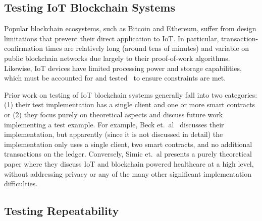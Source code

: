 
\subsection{Testing IoT Blockchain Systems}


Popular blockchain ecosystems, such as Bitcoin and Ethereum, suffer from design limitations that prevent their direct application to IoT. In particular, transaction-confirmation times are relatively long (around tens of minutes) and variable on public blockchain networks due largely to their proof-of-work algorithms. Likewise, IoT devices have limited processing power and storage capabilities, which must be accounted for and tested~\cite{IoTandBl20:online} to ensure constraints are met.

Prior work on testing of IoT blockchain systems generally fall into two categories: (1) their test implementation has a single client and one or more smart contracts or (2) they focus purely on theoretical aspects and discuss future work implementing a test example. For example, Beck et.\ al~\cite{beck2016blockchain} discusses their implementation, but apparently (since it is not discussed in detail) the implementation only uses a single client, two smart contracts, and no additional transactions on the ledger. Conversely, Simic et.\ al \cite{simicCaseStudyIoTBlockchainHealthcare2017}  presents a purely theoretical paper where they discuss IoT and blockchain powered healthcare at a high level, without addressing privacy or any of the many other significant implementation difficulties. 

\subsection{Testing Repeatability}


